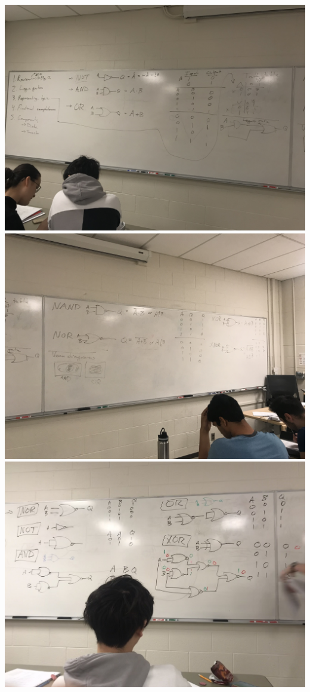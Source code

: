 \documentclass[11pt]{book}
\begin{document}
\includegraphics[width=\textwidth]{figures/4_9_19_board1.jpg}
\\
\includegraphics[width=\textwidth]{figures/4_9_19_board2.jpg}
\\
\includegraphics[width=\textwidth]{figures/4_9_19_board3.jpg}
\end{document}
